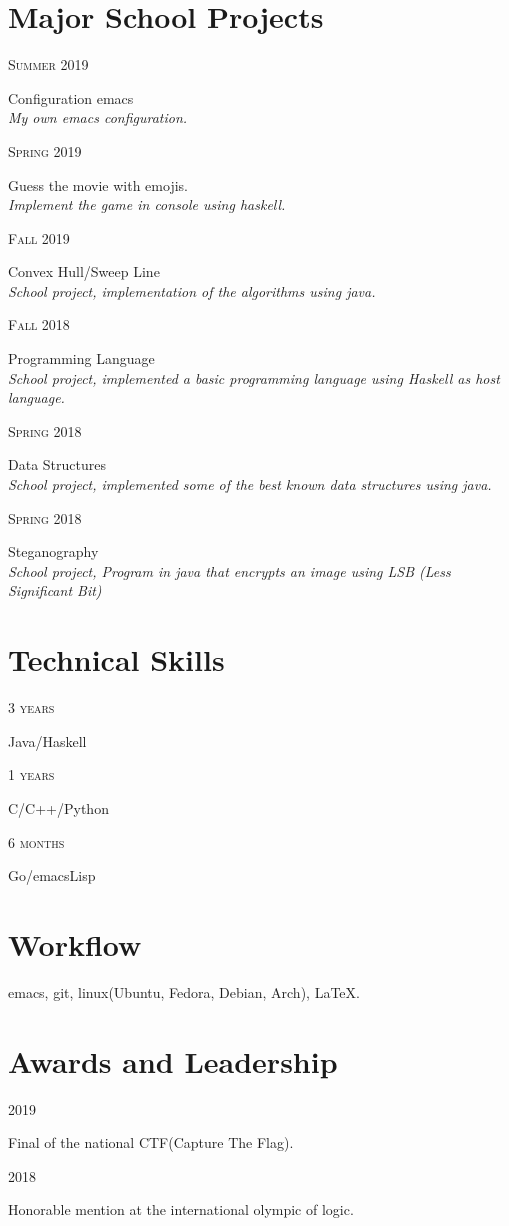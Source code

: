 \documentclass{article}
\newcommand{\SchoolProjects}[3]{
  \begin{minipage}[t]{.15\textwidth}
    \hfill \textsc{#1}\\
  \end{minipage}
  \hfill\vline\hfill
  \begin{minipage}[t]{.80\textwidth}
    #2\\
    \textit{#3}
  \end{minipage}
}
\newcommand{\TSkills}[3]{
  \begin{minipage}[t]{.15\textwidth}
    \hfill \textsc{#1}\\
  \end{minipage}
  \hfill\vline\hfill
  \begin{minipage}[t]{.80\textwidth}
    #2\\
    \textit{#3}
  \end{minipage}
}
\begin{document}
\section{Major School Projects}
\SchoolProjects{Summer 2019}
               {Configuration emacs}
               {My own emacs configuration.}

\SchoolProjects{Spring 2019}
               {Guess the movie with emojis.}
               {Implement the game in console using haskell.}
               
\SchoolProjects{Fall 2019}      
               {Convex Hull/Sweep Line}
               {School project, implementation of the algorithms using java.}
               
\SchoolProjects{Fall 2018}      
               {Programming Language}
               {School project, implemented a basic programming language using
                 Haskell as host language.}
               
\SchoolProjects{Spring 2018}      
               {Data Structures}
               {School project, implemented some of the best known data
                 structures using java.}
               
\SchoolProjects{Spring 2018}      
               {Steganography}
               {School project, Program in java that encrypts an image using LSB
                 (Less Significant Bit)}

\section{Technical Skills}
               
\TSkills{3 years}
        {Java/Haskell}
        {}

\TSkills{1 years}
        {C/C++/Python}
        {}

\TSkills{6 months}
        {Go/emacsLisp}
        {}

\section{Workflow}
emacs, git, linux(Ubuntu, Fedora, Debian, Arch), \LaTeX.

\section{Awards and Leadership}
\TSkills{2019}
        {Final of the national CTF(Capture The Flag).}
        {}

\TSkills{2018}
        {Honorable mention at the international olympic of logic.}
        {}
\end{document}
